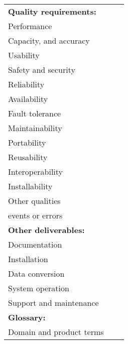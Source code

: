 \documentclass[a4paper]{article}
\begin{document}
\begin{tabular}{|l|l|l|}
		\textbf{Quality requirements:}	&	&	\\
		Performance	&	&	\\ \hline
		Capacity, and accuracy	&	&	\\ \hline
		Usability	&	&	\\ \hline
		Safety and security	&	&	\\ \hline
		Reliability	&	&	\\ \hline
		Availability	&	&	\\ \hline
		Fault tolerance	&	&	\\ \hline
		Maintainability	&	&	\\ \hline
		Portability	&	&	\\ \hline
		Reusability	&	&	\\ \hline
		Interoperability	&	&	\\ \hline
		Installability	&	&	\\ \hline
		Other qualities	&	&	\\ \hline
		events or errors	&	&	\\ \hline
		\textbf{Other deliverables:}	&	&	\\
		Documentation	&	&	\\ \hline
		Installation	&	&	\\ \hline
		Data conversion	&	&	\\ \hline
		System operation	&	&	\\ \hline
		Support and maintenance	&	&	\\ \hline
		\textbf{Glossary:}	&	&	\\
		Domain and product terms	&	&	\\ \hline
	\end{tabular}
\end{document}
